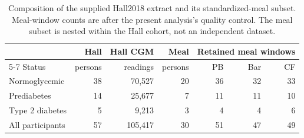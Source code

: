 \begin{table}[htbp]
\centering
\caption{Composition of the supplied Hall2018 extract and its standardized-meal subset. Meal-window counts are after the present analysis's quality control. The meal subset is nested within the Hall cohort, not an independent dataset.}
\label{tab:dataset-cohort}
\small
\begin{tabular}{lrrrrrr}
\toprule
& Hall & Hall CGM & Meal & \multicolumn{3}{c}{Retained meal windows} \\
\cmidrule(lr){5-7}
Status & persons & readings & persons & PB & Bar & CF \\
\midrule
Normoglycemic & 38 & 70,527 & 20 & 36 & 32 & 33 \\
Prediabetes & 14 & 25,677 & 7 & 11 & 11 & 10 \\
Type 2 diabetes & 5 & 9,213 & 3 & 4 & 4 & 6 \\
\midrule
All participants & 57 & 105,417 & 30 & 51 & 47 & 49 \\
\bottomrule
\end{tabular}
\end{table}

